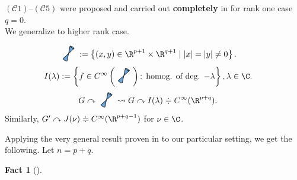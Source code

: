 \documentclass[portrait,final,paperwidth=90cm,paperheight=120cm,fontscale=0.3]{baposter}
\newcommand{\mybox}[2]{
	\begin{tcolorbox}[colback=green!5,colframe=green!40!black,title=#1]#2\end{tcolorbox}
}
\newtheorem{fact}{Fact}
\theoremstyle{definition}
\newcommand{\tikzcone}[1]{
 \begin{tikzpicture}[scale=#1,rotate=-30]
\def\h{6}
\def\a{2}
\def\b{0.5}
\definecolor{top}{RGB}{65,134,198}
\definecolor{middle}{RGB}{126,169,208}
\def\shadebody{\fill[
    left color=top,
    right color=top,
    middle color=middle,
    shading=axis,
    opacity=1
    ] }
\def\shadetop{\fill[
    top color=top,
    bottom color=top,
    middle color=middle,
    shading=axis,
    opacity=1
    ] }


\shadebody
  (\a,0) -- (0,\h) -- (-\a,0) arc (180:360:\a cm and \b cm);
\draw[line width = 0.5pt] 
  (-\a,0) arc (180:360:\a cm and \b cm) -- (0,\h) -- cycle;

\shadetop
(0,2*\h) circle (\a cm and \b cm);

\shadebody
  (\a,2*\h) -- (0,\h) -- (-\a,2*\h) arc (180:360:\a cm and \b cm);
  \draw[line width = 0.5pt] 
  (-\a,2*\h) arc (180:360:\a cm and \b cm) -- (0,\h) -- cycle;

  \draw[line width = 0.5pt] 
  (\a,2*\h) arc (0:180:\a cm and \b cm);
\end{tikzpicture}
 }
\newcommand{\raisedtikzcone}{\raisebox{-0.2cm}{\tikzcone{0.05}}}
\begin{document}
\begin{poster}
 {
	 \mybox{{$(G,G')=(O(p+1,q+1, O(p,q+1)))$}}
	 {
		 $(\mathcal{C}1)$--$(\mathcal{C}5)$ were proposed and carried out {\bf completely} in \cite{kobayashi2015symmetry} for  
	 rank one case $q=0$.\\
	 We generalize to higher rank case.
 	}
	\mybox{{$\left( \pi,\pi' \right)=(I(\lambda),J(\nu))$ ``standard'' reps}}{
		\begin{equation*}
			\kern-0.5cm\raisedtikzcone:=\left\{ (x,y)\in\R^{p+1}\times\R^{q+1}\mid \myabs{x}=\myabs{y}\neq0 \right\}.
		\end{equation*}
		\begin{equation*}
			\kern-0.5cm I(\lambda):=\left\{f\in C^\infty\left( \raisedtikzcone \right)\mbox{: homog. of deg. $-\lambda$}\right\},\lambda\in\C.
		\end{equation*}
		\begin{equation*}
			\kern-0.5cm G\curvearrowright \raisedtikzcone\leadsto G\curvearrowright I(\lambda)\doteqdot C^\infty(\R^{p+q}).
		\end{equation*}
		Similarly, $G'\curvearrowright J(\nu)\doteqdot C^\infty (\R^{p+q-1})$ for $\nu\in\C$.
 	}
 }
 {
    \smaller
    \nocite{kobayashi2015program}
    \nocite{kobayashi2015symmetry}
    \nocite{kobayashi2016differential1}


   \vspace{0.3em}
 }
 {
Applying the very general result proven in \cite[Chap.\ 3]{kobayashi2015symmetry} to our particular setting, we get the following. Let $n=p+q$.
\begin{fact}[{\cite[Thm. 3.16]{kobayashi2015symmetry}}]\label{fact1}

\end{fact}}
\end{poster}
\end{document}
